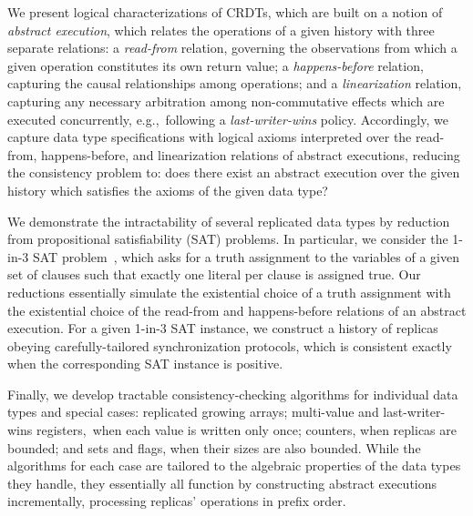 We present logical characterizations of CRDTs, which are built on a notion of \emph{abstract execution}, which relates the operations of a given history with three separate relations: a \emph{read-from} relation, governing the observations from which a given operation constitutes its own return value; a \emph{happens-before} relation, capturing the causal relationships among operations; and a \emph{linearization} relation, capturing any necessary arbitration among non-commutative effects which are executed concurrently, e.g.,~following a \emph{last-writer-wins} policy. Accordingly, we capture data type specifications with logical axioms interpreted over the read-from, happens-before, and linearization relations of abstract executions, reducing the consistency problem to: does there exist an abstract execution over the given history which satisfies the axioms of the given data type?

We demonstrate the intractability of several replicated data types by reduction from propositional satisfiability (SAT) problems. In particular, we consider the 1-in-3 SAT problem~\cite{DBLP:books/fm/GareyJ79}, which asks for a truth assignment to the variables of a given set of clauses such that exactly one literal per clause is assigned true. Our reductions essentially simulate the existential choice of a truth assignment with the existential choice of the read-from and happens-before relations of an abstract execution. For a given 1-in-3 SAT instance, we construct a history of replicas obeying carefully-tailored synchronization protocols, which is consistent exactly when the corresponding SAT instance is positive.

Finally, we develop tractable consistency-checking algorithms for individual data types and special cases: replicated growing arrays; multi-value and last-writer-wins registers, when each value is written only once; counters, when replicas are bounded; and sets and flags, when their sizes are also bounded. While the algorithms for each case are tailored to the algebraic properties of the data types they handle, they essentially all function by constructing abstract executions incrementally, processing replicas’ operations in prefix order.

